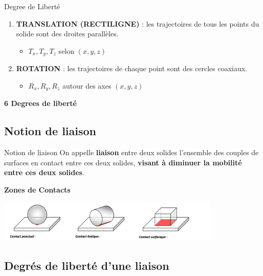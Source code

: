 \documentclass[
  ignorenonframetext,
  aspectratio=169,
  c]{beamer}
\providecommand{\tightlist}{%
  \setlength{\itemsep}{0pt}\setlength{\parskip}{0pt}}\usepackage{longtable,booktabs,array}
\begin{document}
\begin{frame}{Degree de Liberté}
\label{degree-de-libertuxe9-1}
\begin{enumerate}
\tightlist
\item
  \textbf{TRANSLATION (RECTILIGNE)} : les trajectoires de tous les
  points du solide sont des droites parallèles.

  \begin{itemize}
  \tightlist
  \item
    \(T_x, T_y, T_z\) selon \((x,y,z)\)
  \end{itemize}
\item
  \textbf{ROTATION} : les trajectoires de chaque point sont des cercles
  coaxiaux.

  \begin{itemize}
  \tightlist
  \item
    \(R_x, R_y, R_z\) autour des axes \((x,y,z)\)
  \end{itemize}
\end{enumerate}

\textbf{6 Degrees de liberté}
\end{frame}

\subsection{Notion de liaison}\label{notion-de-liaison}

\begin{frame}{Notion de liaison}
On appelle \textbf{liaison} entre deux solides l'ensemble des couples de
surfaces en contact entre ces deux solides, \textbf{visant à diminuer la
mobilité entre ces deux solides}.

\textbf{Zones de Contacts}

\begin{center}
\includegraphics[width=0.8\textwidth,height=\textheight]{CM3/Contact.png}
\end{center}
\end{frame}

\subsection{Degrés de liberté d'une
liaison}\label{degruxe9s-de-libertuxe9-dune-liaison}
\end{document}
